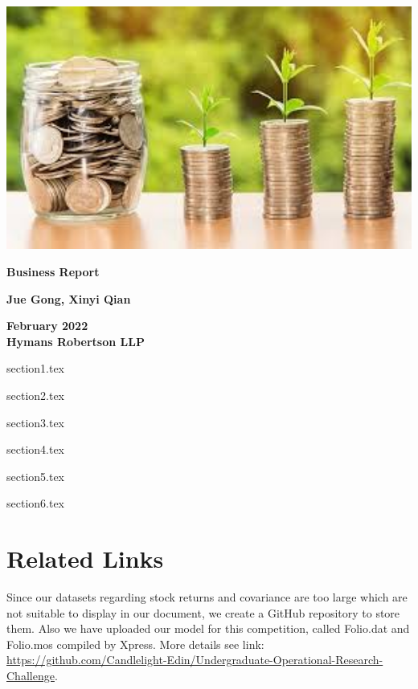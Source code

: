 \documentclass[12pt]{article}
\begin{document}
\begin{titlepage}

\begin{center}
    \includegraphics[width=15cm]{./titlepage.jpeg}
    
    \vspace*{1cm}

    \textbf{\Huge \bfseries Business Report}
            
    \vspace{1.5cm}

    \textbf{\large Jue Gong, Xinyi Qian}

    \vfill
    
    \textbf{February 2022\\
    Hymans Robertson LLP}
\end{center}

\end{titlepage}


\newpage

\tableofcontents
\newpage

{section1.tex}

{section2.tex}

{section3.tex}

{section4.tex}

{section5.tex}

{section6.tex}

\appendix
\section{Related Links}

Since our datasets regarding stock returns and covariance are too large which are not suitable to display in our document, we create a GitHub repository to store them. Also we have uploaded our model for this competition, called Folio.dat and Folio.mos compiled by Xpress. More details see link: \url{https://github.com/Candlelight-Edin/Undergraduate-Operational-Research-Challenge}.
\end{document}
